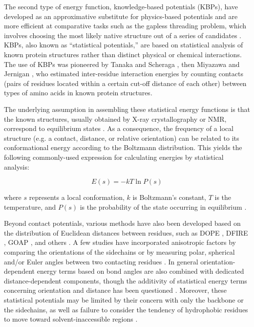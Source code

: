 \documentclass[11pt,titlepage]{article}
\begin{document}
The second type of energy function, knowledge-based potentials (KBPs), have developed as an approximative substitute for physics-based potentials and are more efficient at comparative tasks such as the gapless threading problem, which involves choosing the most likely native structure out of a series of candidates \cite{thomas2}.
KBPs, also known as ``statistical potentials,'' are based on statistical analysis of known protein structures rather than distinct physical or chemical interactions. 
The use of KBPs was pioneered by Tanaka and Scheraga \cite{tanaka}, then Miyazawa and Jernigan \cite{miyazawa}, who estimated inter-residue interaction energies by counting contacts (pairs of residues located within a certain cut-off distance of each other) between types of amino acids in known protein structures.

The underlying assumption in assembling these statistical energy functions is that the known structures, usually obtained by X-ray crystallography or NMR, correspond to equilibrium states \cite{buchete2003}. 
As a consequence, the frequency of a local structure (e.g. a contact, distance, or relative orientation) can be related to its conformational energy according to the Boltzmann distribution.
This yields the following commonly-used expression for calculating energies by statistical analysis:

\begin{equation}
E(s) = -kT\ln{P(s)}
\label{boltzmann_device}
\end{equation}

where $s$ represents a local conformation, $k$ is Boltzmann's constant, $T$ is the temperature, and $P(s)$ is the probability of the state occurring in equilibrium \cite{sippl}.

Beyond contact potentials, various methods have also been developed based on the distribution of Euclidean distances between residues, such as DOPE \cite{shen}, DFIRE \cite{zhou}, GOAP \cite{zhou2}, and others \cite{lu,zhang}.
A few studies have incorporated anisotropic factors by comparing the orientations of the sidechains \cite{zhang3,mukherjee} or by measuring polar, spherical and/or Euler angles between two contacting residues \cite{miyazawa2,buchete2003}. 
In general orientation-dependent energy terms based on bond angles are also combined with dedicated distance-dependent components, though the additivity of statistical energy terms concerning orientation and distance has been questioned \cite{shen}.
Moreover, these statistical potentials may be limited by their concern with only the backbone or the sidechains, as well as failure to consider the tendency of hydrophobic residues to move toward solvent-inaccessible regions \cite{mullinax}.
\end{document}
